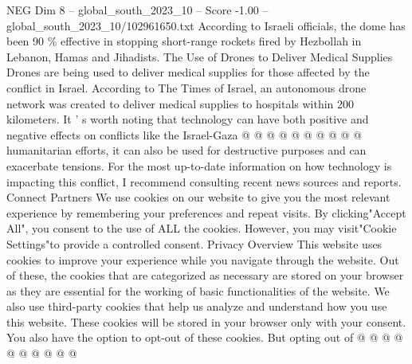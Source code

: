 \begin{textsample}{NEG Dim 8 – global\_south\_2023\_10 – Score -1.00 – global\_south\_2023\_10/102961650.txt}
According to Israeli officials, the dome has been 90 \% effective in stopping short-range rockets fired by Hezbollah in Lebanon, Hamas and Jihadists.
The Use of Drones to Deliver Medical Supplies Drones are being used to deliver medical supplies for those affected by the conflict in Israel.
According to The Times of Israel, an autonomous drone network was created to deliver medical supplies to hospitals within 200 kilometers.
It ' s worth noting that technology can have both positive and negative effects on conflicts like the Israel-Gaza @ @ @ @ @ @ @ @ @ @ humanitarian efforts, it can also be used for destructive purposes and can exacerbate tensions.
For the most up-to-date information on how technology is impacting this conflict, I recommend consulting recent news sources and reports.
Connect Partners We use cookies on our website to give you the most relevant experience by remembering your preferences and repeat visits.
By clicking"Accept All", you consent to the use of ALL the cookies.
However, you may visit"Cookie Settings"to provide a controlled consent.
Privacy Overview This website uses cookies to improve your experience while you navigate through the website.
Out of these, the cookies that are categorized as necessary are stored on your browser as they are essential for the working of basic functionalities of the website.
We also use third-party cookies that help us analyze and understand how you use this website.
These cookies will be stored in your browser only with your consent.
You also have the option to opt-out of these cookies.
But opting out of @ @ @ @ @ @ @ @ @ @

\end{textsample}
